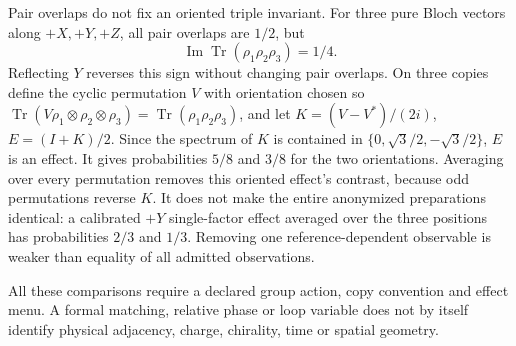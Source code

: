 Pair overlaps do not fix an oriented triple invariant. For three pure Bloch vectors along $+X,+Y,+Z$, all pair overlaps are $1/2$, but
\[
 \operatorname{Im}\operatorname{Tr}(\rho_1\rho_2\rho_3)=1/4.
\]
Reflecting $Y$ reverses this sign without changing pair overlaps. On three copies define the cyclic permutation $V$ with orientation chosen so $\operatorname{Tr}(V\rho_1\otimes\rho_2\otimes\rho_3)=\operatorname{Tr}(\rho_1\rho_2\rho_3)$, and let
$K=(V-V^*)/(2i)$, $E=(I+K)/2$.
Since the spectrum of $K$ is contained in $\{0,\sqrt3/2,-\sqrt3/2\}$, $E$ is an effect. It gives probabilities $5/8$ and $3/8$ for the two orientations. Averaging over every permutation removes this oriented effect's contrast, because odd permutations reverse $K$. It does not make the entire anonymized preparations identical: a calibrated $+Y$ single-factor effect averaged over the three positions has probabilities $2/3$ and $1/3$. Removing one reference-dependent observable is weaker than equality of all admitted observations.

All these comparisons require a declared group action, copy convention and effect menu. A formal matching, relative phase or loop variable does not by itself identify physical adjacency, charge, chirality, time or spatial geometry.
